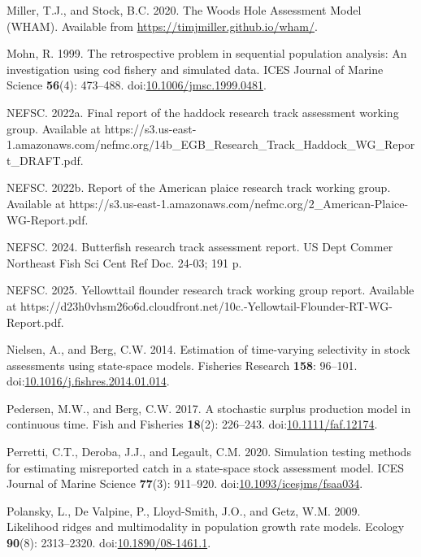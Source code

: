 \begin{CSLReferences}{1}{0}
Miller, T.J., and Stock, B.C. 2020. The {Woods Hole Assessment Model}
({WHAM}). Available from \url{https://timjmiller.github.io/wham/}.

Mohn, R. 1999. The retrospective problem in sequential population
analysis: An investigation using cod fishery and simulated data. ICES
Journal of Marine Science \textbf{56}(4): 473--488.
doi:\href{https://doi.org/10.1006/jmsc.1999.0481}{10.1006/jmsc.1999.0481}.

NEFSC. 2022a. Final report of the haddock research track assessment
working group. {Available} at
https://s3.us-east-1.amazonaws.com/nefmc.org/14b\_EGB\_Research\_Track\_Haddock\_WG\_Report\_DRAFT.pdf.

NEFSC. 2022b. Report of the {A}merican plaice research track working
group. {Available} at
https://s3.us-east-1.amazonaws.com/nefmc.org/2\_American-Plaice-WG-Report.pdf.

NEFSC. 2024. Butterfish research track assessment report. US Dept Commer
Northeast Fish Sci Cent Ref Doc. 24-03; 191 p.

NEFSC. 2025. Yellowttail flounder research track working group report.
{Available} at
https://d23h0vhsm26o6d.cloudfront.net/10c.-Yellowtail-Flounder-RT-WG-Report.pdf.

Nielsen, A., and Berg, C.W. 2014. Estimation of time-varying selectivity
in stock assessments using state-space models. Fisheries Research
\textbf{158}: 96--101.
doi:\href{https://doi.org/10.1016/j.fishres.2014.01.014}{10.1016/j.fishres.2014.01.014}.

Pedersen, M.W., and Berg, C.W. 2017. A stochastic surplus production
model in continuous time. Fish and Fisheries \textbf{18}(2): 226--243.
doi:\href{https://doi.org/10.1111/faf.12174}{10.1111/faf.12174}.

Perretti, C.T., Deroba, J.J., and Legault, C.M. 2020. Simulation testing
methods for estimating misreported catch in a state-space stock
assessment model. ICES Journal of Marine Science \textbf{77}(3):
911--920.
doi:\href{https://doi.org/10.1093/icesjms/fsaa034}{10.1093/icesjms/fsaa034}.

Polansky, L., De Valpine, P., Lloyd-Smith, J.O., and Getz, W.M. 2009.
Likelihood ridges and multimodality in population growth rate models.
Ecology \textbf{90}(8): 2313--2320.
doi:\href{https://doi.org/10.1890/08-1461.1}{10.1890/08-1461.1}.


\end{CSLReferences}
